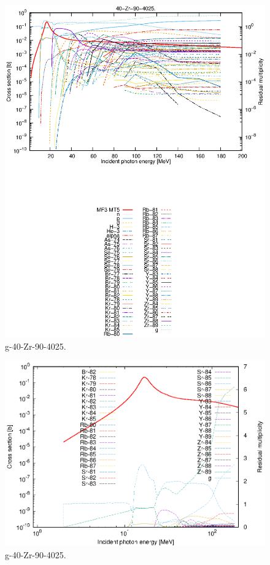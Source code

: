 \begin{figure}
 \includegraphics[width=\linewidth]{eps/g_40-Zr-90_4025.eps}
  \caption{g-40-Zr-90-4025.}
\end{figure}
\newpage \clearpage

\begin{figure}
 \includegraphics[width=\linewidth]{eps-log/g_40-Zr-90_4025.eps}
 \caption{g-40-Zr-90-4025.}
\end{figure}
\newpage \clearpage

